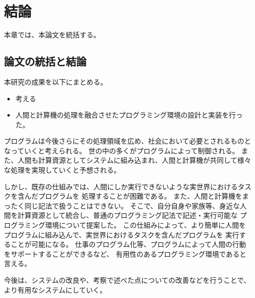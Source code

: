 \chapter{結論}\label{chap:conclusion}

本章では、本論文を統括する。

\section{論文の統括と結論}\label{ux8ad6ux6587ux306eux7d71ux62ecux3068ux7d50ux8ad6}

本研究の成果を以下にまとめる。

\begin{itemize}
\itemsep1pt\parskip0pt
\item
  考える
\item
  人間と計算機の処理を融合させたプログラミング環境の設計と実装を行った。
\end{itemize}

プログラムは今後さらにその処理領域を広め、社会において必要とされるものとなっていくと考えられる。
世の中の多くがプログラムによって制御される。
また、人間も計算資源としてシステムに組み込まれ、人間と計算機が共同して様々な処理を実現していくと予想される。

しかし、既存の仕組みでは、人間にしか実行できないような実世界におけるタスクを含んだプログラムを
処理することが困難である。
また、人間と計算機をまったく同じ記法で扱うことはできない。
そこで、自分自身や家族等、身近な人間を計算資源として統合し、普通のプログラミング記法で記述・実行可能な
プログラミング環境について提案した。
この仕組みによって、より簡単に人間をプログラムに組み込んで、実世界におけるタスクを含んだプログラムを
実行することが可能になる。
仕事のプログラム化等、プログラムによって人間の行動をサポートすることができるなど、
有用性のあるプログラミング環境であると言える。

今後は、システムの改良や、考察で述べた点についての改善などを行うことで、
より有用なシステムにしていく。
